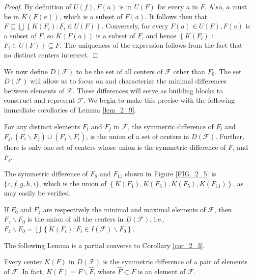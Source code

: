 \begin{proof}
     By definition of $U(f), F(a)$ is in $U(F)$ for every $a$ in $F$. Also, $a$ must be in $K(F(a))$, which is a subset of $F(a)$. It follows then that $F \subseteq \bigcup\left\{K\left(F_i\right): F_i \in U(F)\right\}$. Conversely, for every $F(a) \in U(F), F(a)$ is a subset of $F$, so $K(F(a))$ is a subset of $F$, and hence $\left\{K\left(F_i\right)\right.$ : $\left.F_i \in U(F)\right\} \subseteq F$. The uniqueness of the expression follows from the fact that no distinct centers intersect.
\end{proof}

We now define $D(\mathcal{F})$ to be the set of all centers of $\mathcal{F}$ other than $F_0$. The set $D(\mathcal{F})$ will allow us to focus on and characterize the minimal differences between elements of $\mathcal{F}$. These differences will serve as building blocks to construct and represent $\mathcal{F}$. We begin to make this precise with the following immediate corollaries of Lemma \ref{lem_2_9}.


\begin{corollary}\label{cor_2_3}
For any distinct elements $F_i$ and $F_j$ in $\mathcal{F}$, the symmetric difference of $F_i$ and $F_j,\left(F_i \backslash F_j\right) \cup\left(F_j \backslash F_i\right)$, is the union of a set of centers in $D(\mathcal{F})$. Further, there is only one set of centers whose union is the symmetric difference of $F_i$ and $F_j$.
\end{corollary}

\begin{exmp}\label{exmp_2_8}
    The symmetric difference of $F_8$ and $F_{11}$ shown in Figure \ref{FIG_2_5} is $\{c, f, g, h, i\}$, which is the union of $\left\{K\left(F_1\right), K\left(F_3\right), K\left(F_5\right), K\left(F_{11}\right)\right\}$, as may easily be verified.
\end{exmp}

\begin{corollary}\label{cor_2_4}
    If $F_0$ and $F_z$ are respectively the minimal and maximal elements of $\mathcal{F}$, then $F_z \backslash F_0$ is the union of all the centers in $D(\mathcal{F})$. i.e., $F_z \backslash F_0=\bigcup\left\{K\left(F_i\right): F_i \in I(\mathcal{F}) \backslash F_0\right\}$.
\end{corollary}

The following Lemma is a partial converse to Corollary \ref{cor_2_3}.

\begin{lemma}\label{lem_2_10}
    Every center $K(F)$ in $D(\mathcal{F})$ is the symmetric difference of a pair of elements of $\mathcal{F}$. In fact, $K(F)=F \backslash \hat{F}$, where $\hat{F} \subset F$ is an element of $\mathcal{F}$.
\end{lemma}


